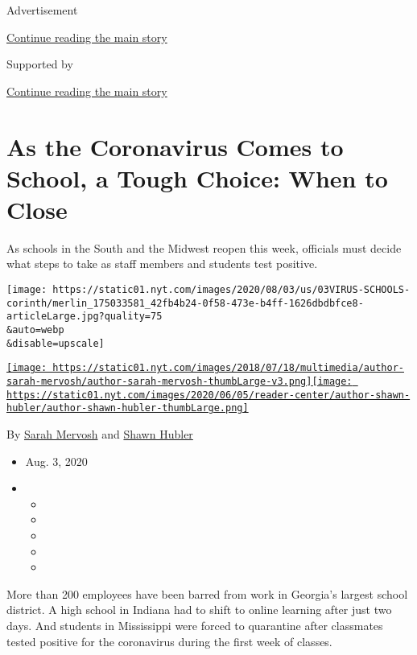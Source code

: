 Advertisement

\protect\hyperlink{after-top}{Continue reading the main story}

Supported by

\protect\hyperlink{after-sponsor}{Continue reading the main story}

\hypertarget{as-the-coronavirus-comes-to-school-a-tough-choice-when-to-close}{%
\section{As the Coronavirus Comes to School, a Tough Choice: When to
Close}\label{as-the-coronavirus-comes-to-school-a-tough-choice-when-to-close}}

As schools in the South and the Midwest reopen this week, officials must
decide what steps to take as staff members and students test positive.

\texttt{[image: https://static01.nyt.com/images/2020/08/03/us/03VIRUS-SCHOOLS-corinth/merlin\_175033581\_42fb4b24-0f58-473e-b4ff-1626dbdbfce8-articleLarge.jpg?quality=75\\\&auto=webp\\\&disable=upscale]}

\href{https://www.nytimes.com/by/sarah-mervosh}{\texttt{[image: https://static01.nyt.com/images/2018/07/18/multimedia/author-sarah-mervosh/author-sarah-mervosh-thumbLarge-v3.png]}}\href{https://www.nytimes.com/by/shawn-hubler}{\texttt{[image: https://static01.nyt.com/images/2020/06/05/reader-center/author-shawn-hubler/author-shawn-hubler-thumbLarge.png]}}

By \href{https://www.nytimes.com/by/sarah-mervosh}{Sarah Mervosh} and
\href{https://www.nytimes.com/by/shawn-hubler}{Shawn Hubler}

\begin{itemize}
\item
  Aug. 3, 2020
\item
  \begin{itemize}
  \item
  \item
  \item
  \item
  \item
  \end{itemize}
\end{itemize}

More than 200 employees have been barred from work in Georgia's largest
school district. A high school in Indiana had to shift to online
learning after just two days. And students in Mississippi were forced to
quarantine after classmates tested positive for the coronavirus during
the first week of classes.

